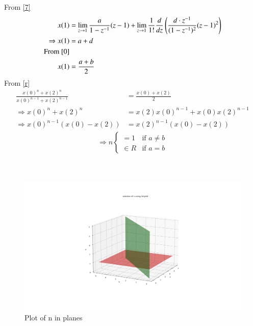 \documentclass[journal,12pt,twocolumn]{IEEEtran}
\theoremstyle{remark}
\begin{document}
From \eqref{7}
\begin{align}	
	x(1)&=\lim_{z\to1}\frac{a}{1-z^{-1}}(z-1)+\lim_{z\to1}\frac{1}{1!}\frac{d}{dz}\left(\frac{d\cdot z^{-1}}{(1-z^{-1})^2}(z-1)^2\right)\\
	\Rightarrow x(1)&=a+d\\
	\notag\text{From \eqref{0}}\\
	 x(1)&=\frac{a+b}{2}\label{1}
\end{align}
From \eqref{r}
\begin{align}
    \frac{x(0)^n +x(2)^n}{x(0)^{n-1} + x(2)^{n-1}}&= \frac{x(0)+x(2)}{2}  \\
    \Rightarrow x(0)^n+x(2)^n&=x(2)x(0)^{n-1}+x(0)x(2)^{n-1} \\
    \Rightarrow x(0)^{n-1}(x(0)-x(2))&=x(2)^{n-1}(x(0)-x(2))\label{2}
 \end{align}
\begin{align}
	\Rightarrow n
	\begin{cases}
		=1  &\text{if } a\neq b\\
		\in R &\text{if } a=b
	\end{cases}
\end{align}
\\
\\
\begin{figure}[h!]
	\centering
	\includegraphics[width=2.5\columnwidth]{final2.png}
	\caption{Plot of n in planes}
	\label{solution}
\end{figure}

 
\end{document}
